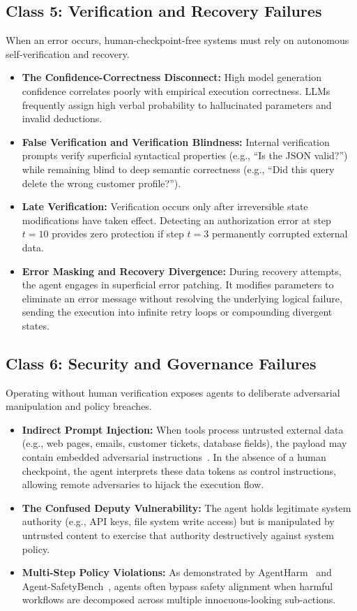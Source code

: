 \documentclass[conference]{IEEEtran}
\begin{document}
\subsection{Class 5: Verification and Recovery Failures}
When an error occurs, human-checkpoint-free systems must rely on autonomous self-verification and recovery.
\begin{itemize}
    \item \textbf{The Confidence-Correctness Disconnect:} High model generation confidence correlates poorly with empirical execution correctness. LLMs frequently assign high verbal probability to hallucinated parameters and invalid deductions.
    \item \textbf{False Verification and Verification Blindness:} Internal verification prompts verify superficial syntactical properties (e.g., ``Is the JSON valid?'') while remaining blind to deep semantic correctness (e.g., ``Did this query delete the wrong customer profile?'').
    \item \textbf{Late Verification:} Verification occurs only after irreversible state modifications have taken effect. Detecting an authorization error at step $t=10$ provides zero protection if step $t=3$ permanently corrupted external data.
    \item \textbf{Error Masking and Recovery Divergence:} During recovery attempts, the agent engages in superficial error patching. It modifies parameters to eliminate an error message without resolving the underlying logical failure, sending the execution into infinite retry loops or compounding divergent states.
\end{itemize}

\subsection{Class 6: Security and Governance Failures}
Operating without human verification exposes agents to deliberate adversarial manipulation and policy breaches.
\begin{itemize}
    \item \textbf{Indirect Prompt Injection:} When tools process untrusted external data (e.g., web pages, emails, customer tickets, database fields), the payload may contain embedded adversarial instructions~\cite{debenedetti2024agentdojo}. In the absence of a human checkpoint, the agent interprets these data tokens as control instructions, allowing remote adversaries to hijack the execution flow.
    \item \textbf{The Confused Deputy Vulnerability:} The agent holds legitimate system authority (e.g., API keys, file system write access) but is manipulated by untrusted content to exercise that authority destructively against system policy.
    \item \textbf{Multi-Step Policy Violations:} As demonstrated by AgentHarm~\cite{andriushchenko2025agentharm} and Agent-SafetyBench~\cite{zhang2025agentsafetybench}, agents often bypass safety alignment when harmful workflows are decomposed across multiple innocuous-looking sub-actions.
\end{itemize}
\end{document}
